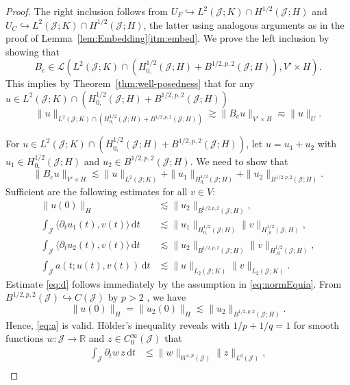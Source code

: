\documentclass{amsart}
\providecommand{\dt}{\,\mathrm{d}t}
\newcommand{\R}{\mathbb R}
\newcommand{\cJ}{\mathcal J}
\newcommand{\be}{\begin{equation}}
\newcommand{\ee}{\end{equation}}
\newcommand{\cL}{\mathcal L}
\begin{document}
\begin{proof} 
The right inclusion follows from $U_F \hookrightarrow L^2(\cJ;K) \cap H^{1/2}(\cJ;H)$ and $U_C \hookrightarrow L^2(\cJ;K) \cap H^{1/2}(\cJ;H)$, the latter using analogous arguments as in the proof of Lemma~\ref{lem:Embedding}\ref{itm:embed}.
%
We prove the left inclusion by showing that
\be \label{eq:5}
B_e \in \cL(L^2(\cJ;K) \cap (H_{0,}^{1/2}(\cJ;H)+ B^{1/2,p,2}(\cJ;H)),V' \times H).
\ee
This implies by Theorem~\ref{thm:well-posedness} that for any $u \in L^2(\cJ;K) \cap (H_{0,}^{1/2}(\cJ;H)+ B^{1/2,p,2}(\cJ;H))$
\begin{equation*}
\|u\|_{L^2(\cJ;K) \cap (H_{0,}^{1/2}(\cJ;H)+ B^{1/2,p,2}(\cJ;H))} \gtrsim \|B_e u\|_{V' \times H} \eqsim \|u\|_U.
\end{equation*}


For $u \in L^2(\cJ;K) \cap (H_{0,}^{1/2}(\cJ;H)+ B^{1/2,p,2}(\cJ;H))$, let $u=u_1+u_2$ with $u_1 \in H_{0,}^{1/2}(\cJ;H)$ and $u_2 \in B^{1/2,p,2}(\cJ;H)$. We need to show that
\begin{equation*}
\|B_e u\|_{V' \times H} \lesssim \|u\|_{L^2(\cJ;K)}+\|u_1\|_{H_{0,}^{1/2}(\cJ;H)}+\|u_2\|_{B^{1/2,p,2}(\cJ;H)}.
\end{equation*}
%
Sufficient are the following estimates for all $v\in V$:
\begin{align} \label{eq:a}
\|u(0)\|_H  &\lesssim \|u_2\|_{B^{1/2,p,2}(\cJ;H)},\\ \label{eq:b}
\int_{\cJ} \langle \partial_t u_1(t),v(t)\rangle \dt &\lesssim \|u_1\|_{H_{0,}^{1/2}(\cJ;H)}\|v\|_{H_{,0}^{1/2}(\cJ;H)},\\ \label{eq:c}
\int_{\cJ} \langle \partial_t u_2(t),v(t)\rangle\dt &\lesssim \|u_2\|_{B^{1/2,p,2}(\cJ;H)}\|v\|_{H_{,0}^{1/2}(\cJ;H)},\\ \label{eq:d}
\int_\cJ a(t;u(t),v(t))\dt &\lesssim \|u\|_{L_2(\cJ;K)} \|v\|_{L_2(\cJ;K)}.
\end{align}
%
Estimate \eqref{eq:d} follows immediately by the assumption in \eqref{eq:normEquia}. 
From $B^{1/2,p,2}(\cJ) \hookrightarrow C(\cJ)$ by $p>2$ \cite[Thm.~7.34(c)]{MR2424078}, we have
\begin{equation*}
\|u(0)\|_H=\|u_2(0)\|_H\lesssim \|u_2\|_{B^{1/2,p,2}(\cJ;H)}.
\end{equation*}
Hence, \eqref{eq:a} is valid.
%
H\"older's inequality reveals with $1/p+1/q=1$ for smooth functions $w\colon \cJ \rightarrow \R$ and $z \in C_0^\infty(\cJ)$ that
\begin{align*}
\int_{\cJ} \partial_t w \, z\dt &\leq \|w\|_{W^{1,p}(\cJ)} \|z\|_{L^q(\cJ)},\\

\end{align*}
\end{proof}
\end{document}
